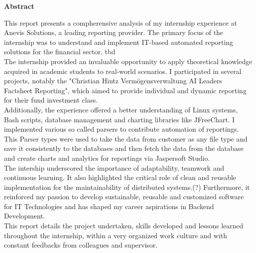 \thispagestyle{empty}


\vspace*{1cm}

\begin{center}
    \textbf{Abstract}
\end{center}

\vspace*{1cm}

This report presents a compherensive analysis of my internship experience at Anevis Solutions, a leading reporting provider. The primary focus of the internship was to understand and implement IT-based automated reporting solutions for the financial sector. tbd\\

The internship provided an invaluable opportunity to apply theoretical knowledge acquired in academic students to real-world scenarios. I participated in several projects, notably the "Christian Hintz Vermögensverwaltung AI Leaders Factsheet Reporting", which aimed to provide individual and dynamic reporting for their fund investment class.\\

Additionally, the experience offered a better understanding of Linux systems, Bash scripts, database management and charting libraries like JFreeChart. I implemented various so called parsers to contribute automation of reportings. This Parser types were used to take the data from customer as any file type and save it consistently to the databases and then fetch the data from the database and create charts and analytics for reportings via Jaspersoft Studio.\\  

The intership underscored the importance of adaptability, teamwork and continuous learning. It also highlighted the critical role of clean and reusable implementation for the maintainability of distributed systems.(?) Furthermore, it reinforced my passion to develop sustainable, reusable and customized software for IT Technologies and has shaped my career aspirations in Backend Development.\\

This report details the project undertaken, skills developed and lessons learned throughout the internship, within a very organized work culture and with constant feedbacks from colleagues and supervisor.



